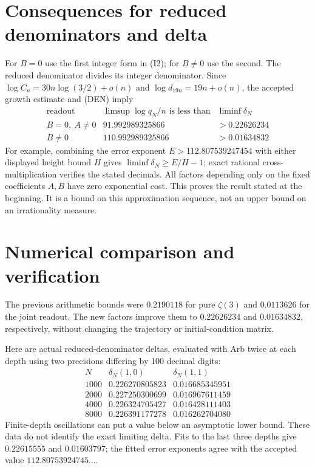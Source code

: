 \documentclass[11pt]{article}
\begin{document}
\section{Consequences for reduced denominators and delta}
For $B=0$ use the first integer form in (I2); for $B\ne0$ use the
second. The reduced denominator divides its integer denominator.
Since $\log C_n=30n\log(3/2)+o(n)$ and
$\log d_{19n}=19n+o(n)$, the accepted growth estimate and (DEN) imply
\[
\begin{array}{c|c|c}
\text{readout}&\limsup\log q_N/n\text{ is less than}
             &\liminf\delta_N\\\hline
B=0,\ A\ne0&91.992989325866&>0.22626234\\
B\ne0&110.992989325866&>0.01634832
\end{array}
\]
For example, combining the error exponent $E>112.807539247454$
with either displayed height bound $H$ gives $\liminf\delta_N\ge E/H-1$;
exact rational cross-multiplication verifies the stated decimals.
All factors depending only on the fixed coefficients $A,B$ have zero
exponential cost. This proves the result stated at the beginning.
It is a bound on this approximation sequence, not an upper bound on an
irrationality measure.

\section{Numerical comparison and verification}
The previous arithmetic bounds were $0.2190118$ for pure $\zeta(3)$
and $0.0113626$ for the joint readout. The new factors improve them to
$0.22626234$ and $0.01634832$, respectively, without changing the
trajectory or initial-condition matrix.

Here are actual reduced-denominator deltas, evaluated with Arb twice
at each depth using two precisions differing by 100 decimal digits:
\[
\begin{array}{r|rr}
N&\delta_N(1,0)&\delta_N(1,1)\\\hline
1000&0.226270805823&0.016685345951\\
2000&0.227250300699&0.016967611459\\
4000&0.226324705427&0.016428111403\\
8000&0.226391177278&0.016262704080
\end{array}
\]
Finite-depth oscillations can put a value below an asymptotic lower
bound. These data do not identify the exact limiting delta. Fits to the
last three depths give $0.22615555$ and $0.01603797$; the fitted error
exponents agree with the accepted value $112.80753924745\ldots$.
\end{document}

